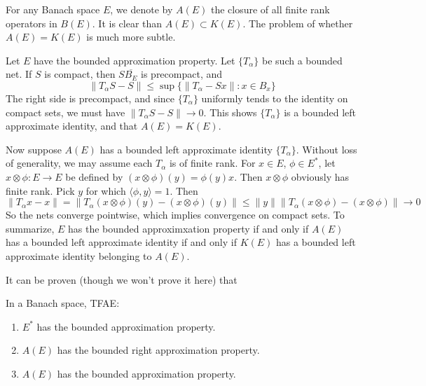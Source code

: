For any Banach space $E$, we denote by $A(E)$ the closure of all finite rank operators in $B(E)$. It is clear than $A(E) \subset K(E)$. The problem of whether $A(E) = K(E)$ is much more subtle.

\begin{example}
    Let $E$ have the bounded approximation property. Let $\{ T_\alpha \}$ be such a bounded net. If $S$ is compact, then $S\overline{B_E}$ is precompact, and
    \[ \| T_\alpha S - S \| \leq \sup \{ \| T_\alpha - Sx \| : x \in B_x \} \]
    The right side is precompact, and since $\{ T_\alpha \}$ uniformly tends to the identity on compact sets, we must have $\| T_\alpha S - S \| \to 0$. This shows $\{ T_\alpha \}$ is a bounded left approximate identity, and that $A(E) = K(E)$.

    Now suppose $A(E)$ has a bounded left approximate identity $\{ T_\alpha \}$. Without loss of generality, we may assume each $T_\alpha$ is of finite rank. For $x \in E$, $\phi \in E^*$, let $x \otimes \phi : E \to E$ be defined by $(x \otimes \phi)(y) = \phi(y) x$. Then $x \otimes \phi$ obviously has finite rank. Pick $y$ for which $\langle \phi, y \rangle = 1$. Then
    \[ \| T_\alpha x - x \| = \| T_\alpha (x \otimes \phi)(y) - (x \otimes \phi)(y) \| \leq \| y \| \| T_\alpha (x \otimes \phi) - (x \otimes \phi) \| \to 0 \]
    So the nets converge pointwise, which implies convergence on compact sets. To summarize, $E$ has the bounded approximxation property if and only if $A(E)$ has a bounded left approximate identity if and only if $K(E)$ has a bounded left approximate identity belonging to $A(E)$.
\end{example}

It can be proven (though we won't prove it here) that

\begin{theorem}
    In a Banach space, TFAE:
    \begin{enumerate}
        \item $E^*$ has the bounded approximation property.
        \item $A(E)$ has the bounded right approximation property.
        \item $A(E)$ has the bounded approximation property.
    \end{enumerate}
\end{theorem}


